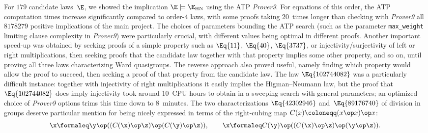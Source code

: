 For $179$ candidate laws~$\E$, we showed the implication $\E\models\E_{\mathrm{HN}}$ using the ATP \emph{Prover9}.  For equations of this order, the ATP computation times increase significantly compared to order-$4$ laws, with some proofs taking $20$~times longer than checking with \emph{Prover9} all $\num{8178279}$ positive implications of the main project.  The choices of parameters bounding the ATP search (such as the parameter \texttt{max\_weight} limiting clause complexity in \emph{Prover9}) were particularly crucial, with different values being optimal in different proofs.  Another important speed-up was obtained by seeking proofs of a simple property such as $\Eq{11}$, $\Eq{40}$, $\Eq{3737}$, or injectivity/surjectivity of left or right multiplications, then seeking proofs that the candidate law together with that property implies some other property, and so on, until proving all three laws characterizing Ward quasigroups.  The reverse approach also proved useful, namely finding which property would allow the proof to succeed, then seeking a proof of that property from the candidate law.  The law $\Eq{102744082}$ was a particularly difficult instance: together with injectivity of right multiplications it easily implies the Higman--Neumann law, but the proof that $\Eq{102744082}$ does imply injectivity took around $10$~CPU hours to obtain in a sweeping search with general parameters; an optimized choice of \emph{Prover9} options trims this time down to $8$~minutes.  The two characterizations $\Eq{42302946}$ and~$\Eq{89176740}$ of division in groups deserve particular mention for being nicely expressed in terms of the right-cubing map $C(x) \coloneqq (x \op x) \op x$:
\[
  \x \formaleq \y \op ((C(\x) \op \z) \op (C(\y) \op \z)) , \qquad
  \x \formaleq C(\y) \op ((C(\x) \op \z) \op (\y \op \z)) .
\]

